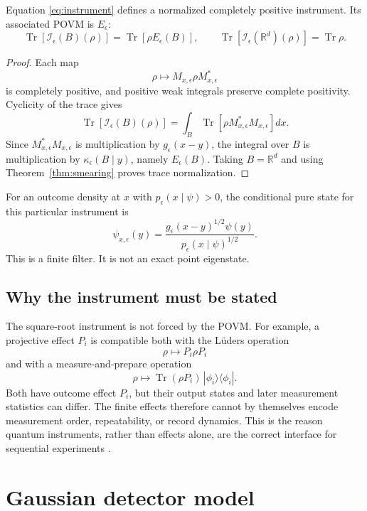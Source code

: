 \documentclass[11pt]{article}
\newcommand{\Ical}{\mathcal I}
\newcommand{\Tr}{\operatorname{Tr}}
\begin{document}
\begin{theorem}
\label{thm:instrument}
Equation \eqref{eq:instrument} defines a normalized completely positive
instrument. Its associated POVM is \(E_\epsilon\):
\[
\Tr\!\left[\Ical_\epsilon(B)(\rho)\right]
=\Tr\!\left[\rho E_\epsilon(B)\right],
\qquad
\Tr\!\left[\Ical_\epsilon(\mathbb R^d)(\rho)\right]
=\Tr\rho.
\]
\end{theorem}

\begin{proof}
Each map
\[
\rho\longmapsto
M_{x,\epsilon}\rho M_{x,\epsilon}^{*}
\]
is completely positive, and positive weak integrals preserve complete
positivity. Cyclicity of the trace gives
\[
\Tr\!\left[\Ical_\epsilon(B)(\rho)\right]
=\int_B
\Tr\!\left[\rho M_{x,\epsilon}^{*}M_{x,\epsilon}\right]dx.
\]
Since \(M_{x,\epsilon}^{*}M_{x,\epsilon}\) is multiplication by
\(g_\epsilon(x-y)\), the integral over \(B\) is multiplication by
\(\kappa_\epsilon(B\mid y)\), namely \(E_\epsilon(B)\). Taking
\(B=\mathbb R^d\) and using Theorem~\ref{thm:smearing} proves trace
normalization.
\end{proof}

For an outcome density at \(x\) with \(p_\epsilon(x\mid\psi)>0\), the
conditional pure state for this particular instrument is
\[
\psi_{x,\epsilon}(y)
=
\frac{
g_\epsilon(x-y)^{1/2}\psi(y)
}{
p_\epsilon(x\mid\psi)^{1/2}
}.
\]
This is a finite filter. It is not an exact point eigenstate.

\subsection*{Why the instrument must be stated}

The square-root instrument is not forced by the POVM. For example, a
projective effect \(P_i\) is compatible both with the L\"uders operation
\[
\rho\longmapsto P_i\rho P_i
\]
and with a measure-and-prepare operation
\[
\rho\longmapsto
\Tr(\rho P_i)\,|\phi_i\rangle\langle\phi_i|.
\]
Both have outcome effect \(P_i\), but their output states and later
measurement statistics can differ. The finite effects therefore cannot by
themselves encode measurement order, repeatability, or record dynamics. This
is the reason quantum instruments, rather than effects alone, are the correct
interface for sequential experiments \cite{DaviesLewis1970}.

\section{Gaussian detector model}
\end{document}
